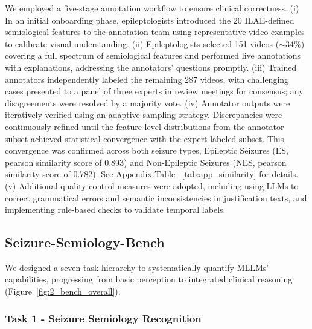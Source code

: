 \documentclass{article}
\theoremstyle{plain}
\theoremstyle{definition}
\theoremstyle{remark}
\begin{document}
We employed a five-stage annotation workflow to ensure clinical correctness. (i) In an initial onboarding phase, epileptologists introduced the 20 ILAE-defined semiological features to the annotation team using representative video examples to calibrate visual understanding. (ii) Epileptologists
 selected 151 videos ($\sim34\%$) covering a full spectrum of semiological features and performed live annotations with explanations, addressing the annotators' questions promptly. (iii) Trained annotators independently labeled the remaining 287 videos, with challenging cases presented to a panel of three experts in review meetings for consensus; any disagreements were resolved by a majority vote. (iv) Annotator outputs were iteratively verified using an adaptive sampling strategy. Discrepancies were continuously refined until the feature-level distributions from the annotator subset achieved statistical convergence with the expert-labeled subset. This convergence was confirmed across both seizure types, Epileptic Seizures (ES, pearson similarity score of 0.893) and Non-Epileptic Seizures (NES, pearson similarity score of 0.782). See Appendix Table ~\ref{tab:app_similarity} for details. (v) Additional quality control measures were adopted, including using LLMs to correct grammatical errors and semantic inconsistencies in justification texts, and implementing rule-based checks to validate temporal labels.

\subsection{Seizure-Semiology-Bench}
\label{subsec:tasks_metrics}



We designed a seven-task hierarchy to systematically quantify MLLMs' capabilities, progressing from basic perception to integrated clinical reasoning (Figure~\ref{fig:2_bench_overall}).

\subsubsection{Task 1 - Seizure Semiology Recognition}
\label{subsubsec:tasks1_metrics}
\end{document}
